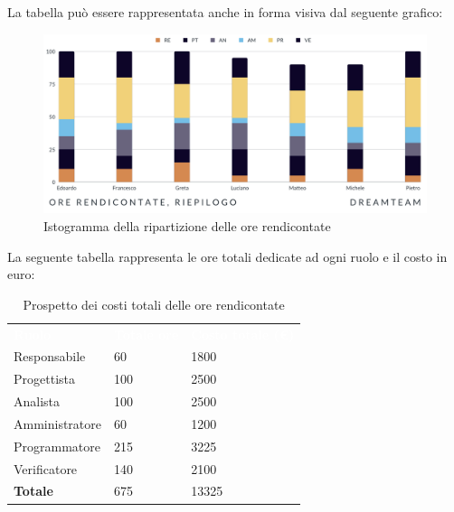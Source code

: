 La tabella può essere rappresentata anche in forma visiva dal seguente grafico:
\begin{figure}[!h]
\centering
\includegraphics[scale=0.65]{Sezioni/SezioniPreventivo/grafici/Riepilogo_ore_rendicontate.png}
\caption{Istogramma della ripartizione delle ore rendicontate}
\end{figure}

La seguente tabella rappresenta le ore totali dedicate ad ogni ruolo e il costo in euro:

\begin{table}[!htbp]
\begin{center}
\renewcommand{\arraystretch}{1.5}
\begin{tabular}{ m{}<{\centering}  m{}<{\centering} m{}<{\centering}}
	\rowcolor{darkblue}
	\textcolor{white}{\textbf{Ruolo}}&\textcolor{white}{\textbf{Totale ore}}&\textcolor{white}{\textbf{Costo totale (\euro)}}\\ 

	Responsabile  & 60 & 1800 \\	
	
	Progettista & 100 & 2500 \\
	
	Analista & 100 & 2500 \\

	Amministratore & 60 & 1200 \\
	
	Programmatore & 215 & 3225 \\
	
	Verificatore & 140 & 2100 \\
	
	\textbf{Totale} & 675 & 13325 \\
	
\end{tabular}
\caption{Prospetto dei costi totali delle ore rendicontate}
\end{center}
\end{table}

